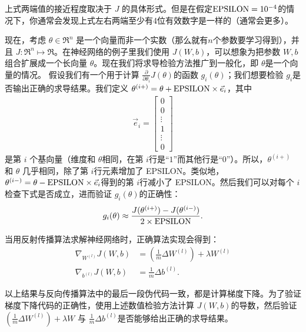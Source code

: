 上式两端值的接近程度取决于 $ J$ 的具体形式。但是在假定$ {\rm EPSILON} = 10^{-4} $的情况下，你通常会发现上式左右两端至少有4位有效数字是一样的（通常会更多）。

现在，考虑 $ \theta \in \Re^n$ 是一个向量而非一个实数（那么就有$ n$个参数要学习得到），并且 $ J: \Re^n \mapsto \Re$。在神经网络的例子里我们使用 $ J(W,b)$，可以想象为把参数 $ W,b$ 组合扩展成一个长向量 $ \theta$。现在我们将求导检验方法推广到一般化，即 $ \theta $是一个向量的情况。
假设我们有一个用于计算 $ \frac{\partial}{\partial \theta_i} J(\theta)$的函数 $ g_i(\theta)$；我们想要检验 $ g_i $是否输出正确的求导结果。我们定义 $ \theta^{(i+)} = \theta +
{\rm EPSILON} \times \vec{e}_i$，其中
\begin{align}
\vec{e}_i = \begin{bmatrix}0 \nonumber \\ 0 \nonumber \\ \vdots \nonumber \\ 1 \nonumber \\ \vdots \nonumber \\ 0\end{bmatrix}
\nonumber \end{align}
是第 $ i$ 个基向量（维度和 $ \theta $相同，在第 $ i $行是“$ 1$”而其他行是“$ 0$”）。所以，$ \theta^{(i+)}$ 和 $ \theta$ 几乎相同，除了第 $ i $行元素增加了 EPSILON。类似地，$ \theta^{(i-)} = \theta - {\rm EPSILON} \times \vec{e}_i $得到的第 $ i $行减小了 EPSILON。然后我们可以对每个 $ i $检查下式是否成立，进而验证 $ g_i(\theta) $的正确性：
\begin{align}
g_i(\theta) \approx
\frac{J(\theta^{(i+)}) - J(\theta^{(i-)})}{2 \times {\rm EPSILON}}.
\nonumber \end{align}

当用反射传播算法求解神经网络时，正确算法实现会得到：
\begin{align}
\nabla_{W^{(l)}} J(W,b) &= \left( \frac{1}{m} \Delta W^{(l)} \right) + \lambda W^{(l)} \nonumber \\
\nabla_{b^{(l)}} J(W,b) &= \frac{1}{m} \Delta b^{(l)}.
\nonumber \end{align}

以上结果与反向传播算法中的最后一段伪代码一致，都是计算梯度下降。为了验证梯度下降代码的正确性，使用上述数值检验方法计算 $ J(W,b) $的导数，然后验证 $ \left(\frac{1}{m}\Delta W^{(l)} \right) + \lambda W$ 与 $ \frac{1}{m}\Delta b^{(l)} $是否能够给出正确的求导结果。

